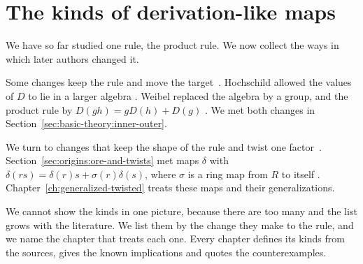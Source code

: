 \section{The kinds of derivation-like maps}\label{sec:basic-theory:family-tree}

We have so far studied one rule, the product rule. We now collect the ways in
which later authors changed it.

Some changes keep the rule and move the target~\cite[Definition~6.4.1, p.~174]{Weibel1994}. Hochschild allowed the values
of $D$ to lie in a larger algebra \cite[Definition~3.1,
p.~688]{Hochschild1942}. Weibel replaced the algebra by a group, and the
product rule by $D(gh) = gD(h) + D(g)$ \cite[Definition~6.4.1, p.~174]{Weibel1994}. We
met both changes in Section~\ref{sec:basic-theory:inner-outer}.

We turn to changes that keep the shape of the rule and twist one factor~\cite[p.~47]{BenkartLopesOndrus2015}.
Section~\ref{sec:origins:ore-and-twists} met maps $\delta$ with $\delta(rs) =
\delta(r)s + \sigma(r)\delta(s)$, where $\sigma$ is a ring map from $R$ to
itself \cite[p.~47]{BenkartLopesOndrus2015}.
Chapter~\ref{ch:generalized-twisted} treats these maps and their
generalizations.

We cannot show the kinds in one picture, because there are too many and the
list grows with the literature. We list them by the change they make to the
rule, and we name the chapter that treats each one. Every chapter defines its
kinds from the sources, gives the known implications and quotes the
counterexamples.

